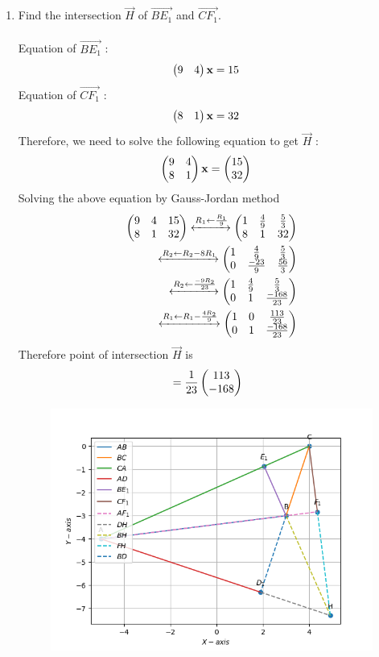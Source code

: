 \documentclass[10pt]{book}
\begin{document}
\begin{enumerate}[label=\thesection.\arabic*.,ref=\thesection.\theenumi]
\item Find the intersection $\vec{H}$ of $\vec{BE_1}$ and $\vec{CF_1}$.\\
\solution\\
 Equation of $\vec{BE_1}$ :
 \begin{align}
     \begin{pmatrix}9 & 4\end{pmatrix}\mathbf{x} &= 15
 \end{align}
  Equation of $\vec{CF_1}$ :
 \begin{align}
    \begin{pmatrix}8 & 1\end{pmatrix}\mathbf{x} &= 32
 \end{align}
Therefore, we need to solve the following equation to get $\vec{H}$ :
\begin{align}
        \begin{pmatrix}9 & 4\\8 & 1\end{pmatrix} \mathbf{x} &= \begin{pmatrix}15 \\ 32\end{pmatrix}
\end{align}
Solving the above equation by Gauss-Jordan method
\begin{align}
        \begin{pmatrix}9 & 4 & 15 \\ 8 & 1 & 32\end{pmatrix}
	 \xleftrightarrow[]{R_1 \leftarrow \frac{R_1}{9}}
        \begin{pmatrix}1 & \frac{4}{9} & \frac{5}{3}\\8 & 1 & 32\end{pmatrix}\\
	 \xleftrightarrow[]{R_2 \leftarrow R_2 - 8R_1}
        \begin{pmatrix}1 & \frac{4}{9} & \frac{5}{3}\\0 & \frac{-23}{9} & \frac{56}{3}\end{pmatrix}\\
	 \xleftrightarrow[]{R_2 \leftarrow \frac{-9R_2}{23}}
        \begin{pmatrix}1 & \frac{4}{9} & \frac{5}{3}\\0 & 1 & \frac{-168}{23}\end{pmatrix}\\
        	 \xleftrightarrow[]{R_1 \leftarrow R_1 - \frac{4R_2}{9}}
                  \begin{pmatrix}1 & 0 & \frac{113}{23}\\0 & 1 & \frac{-168}{23}\end{pmatrix}
\end{align}
Therefore point of intersection $\vec{H}$ is
\begin{align}
	&= \frac{1}{23}\begin{pmatrix}113 \\ -168\end{pmatrix}
\end{align}
\begin{figure}[H]
	\includegraphics[width=\columnwidth]{figs/H_intersection.png}

\end{figure}
\end{enumerate}
\end{document}
